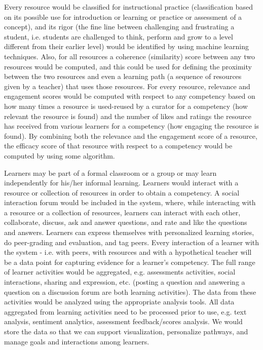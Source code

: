 \begin{multicols}{2}
Every resource would be classified for instructional practice (classification based on its possible use for introduction or learning or practice or assessment of a concept), and its rigor (the fine line between challenging and frustrating a student, i.e. students are challenged to think, perform and grow to a level different from their earlier level) would be identified by using machine learning techniques. Also, for all resources a coherence (similarity) score between any two resources would be computed, and this could be used for defining the proximity between the two resources and even a learning path (a sequence of resources given by a teacher) that uses those resources. For every resource, relevance and engagement scores would be computed with respect to any competency based on how many times a resource is used-reused by a curator for a competency (how relevant the resource is found) and the number of likes and ratings the resource has received from various learners for a competency (how engaging the resource is found). By combining both the relevance and the engagement score of a resource, the efficacy score of that resource with respect to a competency would be computed by using some algorithm.

Learners may be part of a formal classroom or a group or may learn independently for his/her informal learning. Learners would interact with a resource or collection of resources in order to obtain a competency. A social interaction forum would be included in the system, where, while interacting with a resource or a collection of resources, learners can interact with each other, collaborate, discuss, ask and answer questions, and rate and like the questions and answers. Learners can express themselves with personalized learning stories, do peer-grading and evaluation, and tag peers. Every interaction of a learner with the system - i.e. with peers, with resources and with a hypothetical teacher will be a data point for capturing evidence for a learner’s competency. The full range of learner activities would be aggregated, e.g. assessments activities, social interactions, sharing and expression, etc. (posting a question and answering a question on a discussion forum are both learning activities). The data from these activities would be analyzed using the appropriate analysis tools. All data aggregated from learning  activities need to be processed prior to use, e.g. text analysis, sentiment analytics, assessment feedback/scores analysis. We would store the data so that we can support visualization, personalize pathways, and manage goals and interactions among learners.


\end{multicols}
